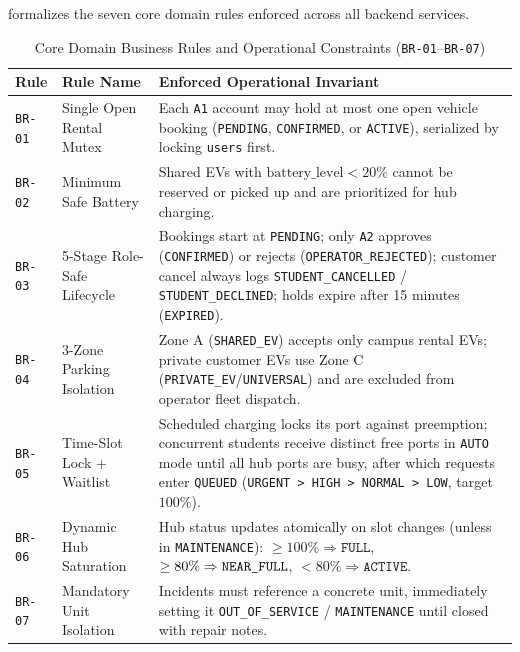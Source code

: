 \label{subsec:business-rules}
 formalizes the seven core domain rules enforced across all backend services.

\begin{table}[H]
  \centering
  \singlespacing\footnotesize
  \caption{Core Domain Business Rules and Operational Constraints (\texttt{BR-01}--\texttt{BR-07})}
  \label{tab:business-rules}
  \renewcommand{\arraystretch}{1.22}
  \begin{tabularx}{\textwidth}{|C{1.4cm}|L{3.4cm}|Y|}
    \hline
    \textbf{Rule} & \textbf{Rule Name} & \textbf{Enforced Operational Invariant} \\
    \hline
    \texttt{BR-01} & Single Open Rental Mutex & Each \texttt{A1} account may hold at most one open vehicle booking (\texttt{PENDING}, \texttt{CONFIRMED}, or \texttt{ACTIVE}), serialized by locking \texttt{users} first. \\
    \hline
    \texttt{BR-02} & Minimum Safe Battery & Shared EVs with $\text{battery\_level} < 20\%$ cannot be reserved or picked up and are prioritized for hub charging. \\
    \hline
    \texttt{BR-03} & 5-Stage Role-Safe Lifecycle & Bookings start at \texttt{PENDING}; only \texttt{A2} approves (\texttt{CONFIRMED}) or rejects (\texttt{OPERATOR\_\allowbreak REJECTED}); customer cancel always logs \texttt{STUDENT\_\allowbreak CANCELLED} / \texttt{STUDENT\_\allowbreak DECLINED}; holds expire after 15 minutes (\texttt{EXPIRED}). \\
    \hline
    \texttt{BR-04} & 3-Zone Parking Isolation & Zone A (\texttt{SHARED\_\allowbreak EV}) accepts only campus rental EVs; private customer EVs use Zone C (\texttt{PRIVATE\_\allowbreak EV}/\allowbreak\texttt{UNIVERSAL}) and are excluded from operator fleet dispatch. \\
    \hline
    \texttt{BR-05} & Time-Slot Lock + Waitlist & Scheduled charging locks its port against preemption; concurrent students receive distinct free ports in \texttt{AUTO} mode until all hub ports are busy, after which requests enter \texttt{QUEUED} (\texttt{URGENT > HIGH > NORMAL > LOW}, target $100\%$). \\
    \hline
    \texttt{BR-06} & Dynamic Hub Saturation & Hub status updates atomically on slot changes (unless in \texttt{MAINTENANCE}): $\ge 100\% \Rightarrow \texttt{FULL}$, $\ge 80\% \Rightarrow \texttt{NEAR\_\allowbreak FULL}$, $< 80\% \Rightarrow \texttt{ACTIVE}$. \\
    \hline
    \texttt{BR-07} & Mandatory Unit Isolation & Incidents must reference a concrete unit, immediately setting it \texttt{OUT\_\allowbreak OF\_\allowbreak SERVICE} / \texttt{MAINTENANCE} until closed with repair notes. \\
    \hline
  \end{tabularx}
\end{table}

